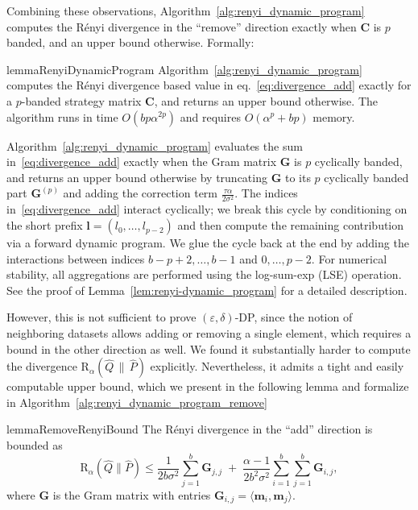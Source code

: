 \documentclass{article}
\theoremstyle{plain}
\theoremstyle{definition}
\theoremstyle{remark}
\begin{document}
Combining these observations, Algorithm~\ref{alg:renyi_dynamic_program} computes the Rényi divergence in the ``remove'' direction exactly when $\mathbf{C}$ is $p$ banded, and an upper bound otherwise. Formally:


\begin{restatable}{lemma}{RenyiDynamicProgram}
\label{lem:renyi-dynamic_program}
Algorithm~\ref{alg:renyi_dynamic_program} computes the Rényi divergence based value in eq.~\ref{eq:divergence_add} exactly for a $p$-banded strategy matrix $\mathbf{C}$, and returns an upper bound otherwise.
The algorithm runs in time $O\!\left(bp \alpha^{2p} \right)$ and requires $O(\alpha^{p} + bp)$ memory.
\end{restatable}

Algorithm~\ref{alg:renyi_dynamic_program} evaluates the sum in~\eqref{eq:divergence_add} exactly when the Gram matrix $\mathbf{G}$ is $p$ cyclically banded, and returns an upper bound otherwise by truncating $\mathbf{G}$ to its $p$ cyclically banded part $\mathbf{G}^{(p)}$ and adding the correction term $\frac{\tau\alpha}{2\sigma^2}$. The indices in~\eqref{eq:divergence_add} interact cyclically; we break this cycle by conditioning on the short prefix $\mathbf{l}=(l_0,\dots,l_{p-2})$ and then compute the remaining contribution via a forward dynamic program. We glue the cycle back at the end by adding the interactions between indices $b-p+2,\dots,b-1$ and $0,\dots,p-2$. For numerical stability, all aggregations are performed using the log-sum-exp (LSE) operation. See the proof of Lemma~\ref{lem:renyi-dynamic_program} for a detailed description.


However, this is not sufficient to prove $(\varepsilon,\delta)$-DP, since the notion of neighboring datasets allows adding or removing a single element, which requires a bound in the other direction as well. We found it substantially harder to compute the divergence $\mathrm{R}_{\alpha}(\hat{Q}\,\|\,\hat{P})$ explicitly. Nevertheless, it admits a tight and easily computable upper bound, which we present in the following lemma and formalize in Algorithm~\ref{alg:renyi_dynamic_program_remove}


\begin{restatable}{lemma}{RemoveRenyiBound}
\label{lem:remove-renyi-bound}
The Rényi divergence in the ``add'' direction is bounded as
\begin{equation}
    \mathrm{R}_{\alpha}(\hat{Q}\|\hat{P})
    \le
    \frac{1}{2b\sigma^2} \sum_{j = 1}^b \mathbf{G}_{j,j}
    \;+\;
    \frac{\alpha - 1}{2b^2\sigma^2} \sum_{i = 1}^b \sum_{j = 1}^b \mathbf{G}_{i,j},
\end{equation}
where $\mathbf{G}$ is the Gram matrix with entries $\mathbf{G}_{i,j} = \langle \mathbf{m}_i, \mathbf{m}_j\rangle$.
\end{restatable}
\end{document}
